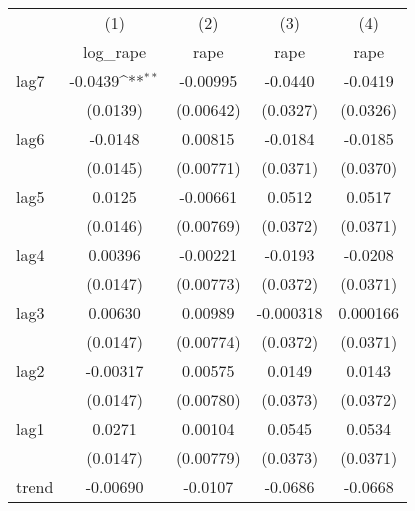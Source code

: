 {
\def\sym#1{\ifmmode^{#1}\else\(^{#1}\)\fi}
\begin{tabular}{l*{4}{c}}
\hline\hline
            &\multicolumn{1}{c}{(1)}&\multicolumn{1}{c}{(2)}&\multicolumn{1}{c}{(3)}&\multicolumn{1}{c}{(4)}\\
            &\multicolumn{1}{c}{log\_rape}&\multicolumn{1}{c}{rape}&\multicolumn{1}{c}{rape}&\multicolumn{1}{c}{rape}\\
\hline
lag7        &     -0.0439\sym{**} &    -0.00995         &     -0.0440         &     -0.0419         \\
            &    (0.0139)         &   (0.00642)         &    (0.0327)         &    (0.0326)         \\
[1em]
lag6        &     -0.0148         &     0.00815         &     -0.0184         &     -0.0185         \\
            &    (0.0145)         &   (0.00771)         &    (0.0371)         &    (0.0370)         \\
[1em]
lag5        &      0.0125         &    -0.00661         &      0.0512         &      0.0517         \\
            &    (0.0146)         &   (0.00769)         &    (0.0372)         &    (0.0371)         \\
[1em]
lag4        &     0.00396         &    -0.00221         &     -0.0193         &     -0.0208         \\
            &    (0.0147)         &   (0.00773)         &    (0.0372)         &    (0.0371)         \\
[1em]
lag3        &     0.00630         &     0.00989         &   -0.000318         &    0.000166         \\
            &    (0.0147)         &   (0.00774)         &    (0.0372)         &    (0.0371)         \\
[1em]
lag2        &    -0.00317         &     0.00575         &      0.0149         &      0.0143         \\
            &    (0.0147)         &   (0.00780)         &    (0.0373)         &    (0.0372)         \\
[1em]
lag1        &      0.0271         &     0.00104         &      0.0545         &      0.0534         \\
            &    (0.0147)         &   (0.00779)         &    (0.0373)         &    (0.0371)         \\
[1em]
trend       &    -0.00690         &     -0.0107         &     -0.0686         &     -0.0668         \\

\end{tabular}}
